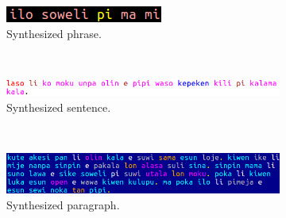 \documentclass{article}
\begin{document}
\begin{figure}     \center
  \begin{subfigure}{.5\textwidth}
    \centering
        \includegraphics[width=.8\linewidth]{figs/phrase_}\vspace{-0.15cm}
          \caption{Synthesized phrase.}
            \label{fig:sfig1}
  \end{subfigure}\\\vspace{0.3cm}
  \begin{subfigure}{.9\textwidth}
    \centering
        \includegraphics[width=1.2\linewidth]{figs/sentence_}\vspace{-0.15cm}
          \caption{Synthesized sentence.}
            \label{fig:sfig2}
  \end{subfigure}\\\vspace{0.3cm}
  \begin{subfigure}{.8\textwidth}
    \centering
        \includegraphics[width=1.2\linewidth]{figs/paragraph_}\vspace{-0.15cm}
          \caption{Synthesized paragraph.}
            \label{fig:sfig2}
  \end{subfigure}\\\vspace{0.3cm}
  \begin{subfigure}{.7\textwidth}
    \centering

\end{subfigure}
\end{figure}
\end{document}
